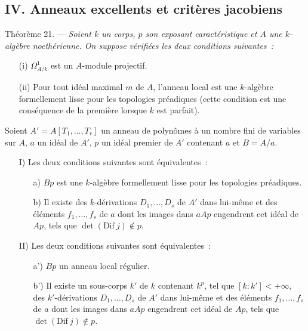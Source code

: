 \subsection*{IV. Anneaux excellents et critères jacobiens}\label{sec:4}%

{
Théorème 21. --- \it Soient $k$ un corps, $p$ son exposant caractéristique et $A$ une $k$-algèbre noethérienne. On suppose vérifiées les deux conditions suivantes~:
\begin{enumerate}
    \item[(i)] $\Omega^1_{A/k}$ est un $A$-module projectif.
    \item[(ii)] Pour tout idéal maximal $m$ de $A$, l'anneau local est une $k$-algèbre formellement lisse pour les topologies préadiques (cette condition est une conséquence de la première lorsque $k$ est parfait).
\end{enumerate}

Soient $A' = A[T_1, \ldots, T_r]$ un anneau de polynômes à un nombre fini de variables sur $A$, $a$ un idéal de $A'$, $p$ un idéal premier de $A'$ contenant $a$ et $B = A/a$.

\begin{enumerate}
    \item[I)] Les deux conditions suivantes sont équivalentes~:
    \begin{enumerate}
        \item[a)] $Bp$ est une $k$-algèbre formellement lisse pour les topologies préadiques.
        \item[b)] Il existe des $k$-dérivations $D_1, \ldots, D_s$ de $A'$ dans lui-même et des éléments $f_1, \ldots, f_s$ de $a$ dont les images dans $aAp$ engendrent cet idéal de $Ap$, tels que $\det(\text{Dif}~j) \notin p$.
    \end{enumerate}
    \item[II)] Les deux conditions suivantes sont équivalentes~:
    \begin{enumerate}
        \item[a')] $Bp$ un anneau local régulier.
        \item[b')] Il existe un sous-corps $k'$ de $k$ contenant $k^p$, tel que $[k : k'] < +\infty$, des $k'$-dérivations $D_1, \ldots, D_s$ de $A'$ dans lui-même et des éléments $f_1, \ldots, f_s$ de $a$ dont les images dans $aAp$ engendrent cet idéal de $Ap$, tels que $\det(\text{Dif}~j) \notin p$.
    \end{enumerate}
\end{enumerate}
}
